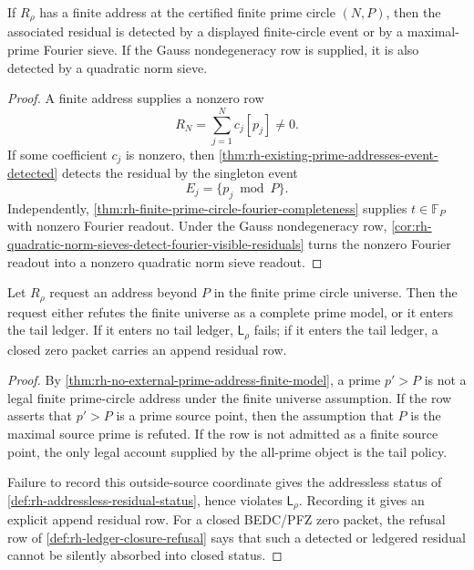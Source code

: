 \begin{theorem}
\label{thm:rh-offline-zero-finite-addresses-are-detected}
If $R_\rho$ has a finite address at the certified finite prime circle
$(N,P)$, then the associated residual is detected by a displayed
finite-circle event or by a maximal-prime Fourier sieve.  If the Gauss
nondegeneracy row is supplied, it is also detected by a quadratic norm
sieve.
\end{theorem}

\begin{proof}
A finite address supplies a nonzero row
$$
R_N=\sum_{j=1}^{N}c_j[p_j]\ne0.
$$
If some coefficient $c_j$ is nonzero, then
\autoref{thm:rh-existing-prime-addresses-event-detected} detects the
residual by the singleton event
$$
E_j=\{p_j\bmod P\}.
$$
Independently,
\autoref{thm:rh-finite-prime-circle-fourier-completeness} supplies
$t\in\mathbb F_P$ with nonzero Fourier readout.  Under the Gauss
nondegeneracy row,
\autoref{cor:rh-quadratic-norm-sieves-detect-fourier-visible-residuals}
turns the nonzero Fourier readout into a nonzero quadratic norm sieve
readout.
\end{proof}

\begin{theorem}
\label{thm:rh-tail-address-cannot-close-silently}
Let $R_\rho$ request an address beyond $P$ in the finite prime circle
universe.  Then the request either refutes the finite universe as a
complete prime model, or it enters the tail ledger.  If it enters no
tail ledger, $\mathsf L_\rho$ fails; if it enters the tail ledger, a
closed zero packet carries an append residual row.
\end{theorem}

\begin{proof}
By
\autoref{thm:rh-no-external-prime-address-finite-model}, a prime
$p'>P$ is not a legal finite prime-circle address under the finite
universe assumption.  If the row asserts that $p'>P$ is a prime source
point, then the assumption that $P$ is the maximal source prime is
refuted.  If the row is not admitted as a finite source point, the only
legal account supplied by the all-prime object is the tail policy.

Failure to record this outside-source coordinate gives the addressless
status of \autoref{def:rh-addressless-residual-status}, hence violates
$\mathsf L_\rho$.  Recording it gives an explicit append residual row.
For a closed BEDC/PFZ zero packet, the refusal row of
\autoref{def:rh-ledger-closure-refusal} says that such a detected or
ledgered residual cannot be silently absorbed into closed status.
\end{proof}

